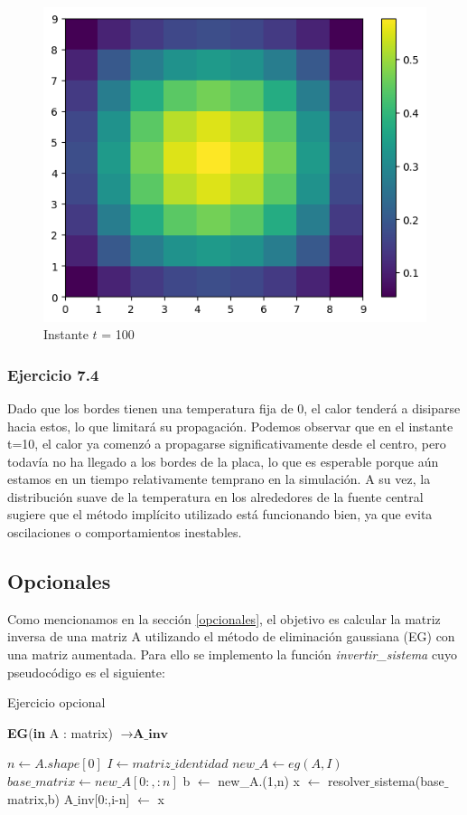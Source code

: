 \begin{figure}[H]
\begin{minipage}[b]{0.5\linewidth}
        \vspace{4ex}
      \end{minipage}%
      \begin{minipage}[b]{0.5\linewidth}
       \centering
       \includegraphics[width=.5\linewidth]{./img/instante100.png}
      \caption{Instante $t$ = 100}\label{instante100}
        \vspace{4ex}
      \end{minipage} 
    \end{figure}


    \subsubsection{Ejercicio 7.4}
    Dado que los bordes tienen una temperatura fija de 0, el calor tenderá a disiparse hacia estos, lo que limitará su propagación.
    Podemos observar que en el instante t=10, el calor ya comenzó a propagarse significativamente desde el centro, pero todavía no ha llegado a los bordes de la placa, lo que es esperable porque aún estamos en un tiempo relativamente temprano en la simulación. A su vez, la distribución suave de la temperatura en los alrededores de la fuente central sugiere que el método implícito utilizado está funcionando bien, ya que evita oscilaciones o comportamientos inestables.
\fi


 \subsection{Opcionales}

 Como mencionamos en la sección \ref{opcionales}, el objetivo es calcular la matriz inversa de una matriz A utilizando el método de eliminación gaussiana (EG) con una matriz aumentada. Para ello se implemento la función \textit{invertir\_sistema} cuyo pseudocódigo es el siguiente: 
 
\begin{algorithm}[H]
\caption{Ejercicio opcional}
\begin{algorithmic}
\State \textbf{EG}(\textbf{in} A : matrix) $\to \textbf{A\_inv}$
 
 \State $n \gets A.shape[0]$
 \State $I \gets matriz\_identidad$
 \State $new\_A \gets eg(A,I)$
 \State $base\_matrix \gets new\_A[0:,:n]$
        \State  b $\gets$ new\_A.(1,n)
        \State x $\gets$ resolver$\_$sistema(base$\_$matrix,b)
        \State A$\_$inv[0:,i-n] $\gets$ x
\EndFor

\end{algorithmic}
\end{algorithm}

